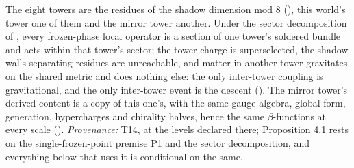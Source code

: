The eight towers are the residues of the shadow dimension mod $8$ \cite[Prop.~3.1]{ButlerT14} (), this world's tower one of them and the mirror tower another. Under the sector decomposition of \cite[Def.~3.6]{ButlerT14}, every frozen-phase local operator is a section of one tower's soldered bundle and acts within that tower's sector; the tower charge is superselected, the shadow walls separating residues are unreachable, and matter in another tower gravitates on the shared metric and does nothing else: the only inter-tower coupling is gravitational, and the only inter-tower event is the descent \cite[Prop.~4.1]{ButlerT14} (). The mirror tower's derived content is a copy of this one's, with the same gauge algebra, global form, generation, hypercharges and chirality halves, hence the same $\beta$-functions at every scale \cite[Thm.~4.3(i),(iii)]{ButlerT14} (). \emph{Provenance:} T14, at the levels declared there; Proposition 4.1 rests on the single-frozen-point premise P1 and the sector decomposition, and everything below that uses it is conditional on the same.

